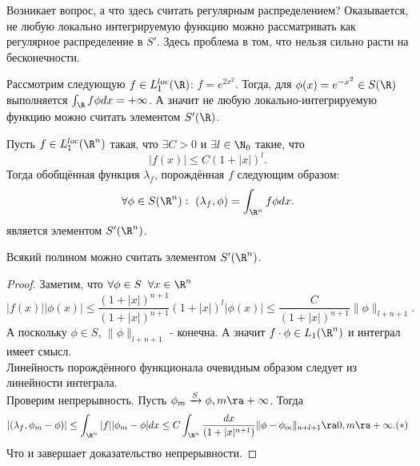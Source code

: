 \begin{note}
Возникает вопрос, а что здесь считать регулярным распределением? Оказывается, не любую локально интегрируемую функцию можно рассматривать как регулярное распределение в $S'$. Здесь проблема в том, что нельзя сильно расти на бесконечности.
\end{note}
\begin{example}
    Рассмотрим следующую $f \in L_1^{loc}(\R)$: $f = e^{2 x^2}$.
    Тогда,  для $\phi(x) = e^{-x^2} \in S(\R)$ выполняется $\int_{\R} f \phi dx = +\infty$.
    А значит не любую локально-интегрируемую функцию можно считать элементом $S'(\R)$.
\end{example}
\begin{lemma}
    Пусть $f \in L_1^{loc}(\R^n)$ такая, что $\exists C > 0$ и $\exists l \in \N_0$ такие, что
    \[
        |f(x)| \leq C(1 + |x|)^l.
    \]
    Тогда обобщённая функция $\lambda_f$, порождённая $f$ следующим образом:
    \[
        \forall \phi \in S(\R^n): \ (\lambda_f, \phi) = \int_{\R^n} f\phi dx.
    \]
    является элементом $S'(\R^n)$.
\end{lemma}
\begin{corollary}
    Всякий полином можно считать элементом $S'(\R^n)$.
\end{corollary}
\begin{proof}
    Заметим, что $\forall \phi \in S \;\; \forall x \in \R^n$
    \[
        |f(x)||\phi(x)| \leq \dfrac{(1 + |x|)^{n + 1}}{(1 + |x|)^{n + 1}}(1 + |x|)^l |\phi(x)| \leq \dfrac{C}{(1 + |x|)^{n + 1}}\|\phi\|_{l + n + 1}.
    \]
    А поскольку $\phi \in S$, $\|\phi\|_{l+n+1}$ - конечна. А значит $f \cdot \phi \in L_1(\R^n)$ и интеграл имеет смысл. \\
    Линейность порождённого функционала очевидным образом следует из линейности интеграла. \\
    Проверим непрерывность. Пусть $\phi_m \xrightarrow{S} \phi, m \ra +\infty$.
    Тогда
    \[
          |(\lambda_f, \phi_m - \phi)| \leq \int_{\R^n} |f||\phi_m - \phi|dx \leq C \int_{\R^n} \dfrac{dx}{(1 + |x|^{n + 1})}\|\phi - \phi_m\|_{n + l + 1} \ra 0, m \ra +\infty. (*)
    \]
    Что и завершает доказательство непрерывности.
\end{proof}
